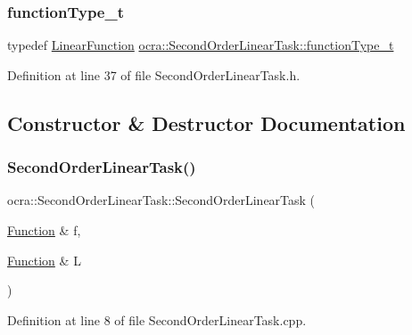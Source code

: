 \subsubsection{\texorpdfstring{function\+Type\+\_\+t}{functionType\_t}}
{\footnotesize\ttfamily typedef \hyperlink{classocra_1_1LinearFunction}{Linear\+Function} \hyperlink{classocra_1_1SecondOrderLinearTask_aa4843b0b2ad21ecba7decb2be86c6214}{ocra\+::\+Second\+Order\+Linear\+Task\+::function\+Type\+\_\+t}}



Definition at line 37 of file Second\+Order\+Linear\+Task.\+h.



\subsection{Constructor \& Destructor Documentation}
\hypertarget{classocra_1_1SecondOrderLinearTask_ac54c18fe5d5ba11cfc728361a8ab86eb}{}\label{classocra_1_1SecondOrderLinearTask_ac54c18fe5d5ba11cfc728361a8ab86eb} 
\subsubsection{\texorpdfstring{Second\+Order\+Linear\+Task()}{SecondOrderLinearTask()}}
{\footnotesize\ttfamily ocra\+::\+Second\+Order\+Linear\+Task\+::\+Second\+Order\+Linear\+Task (\begin{DoxyParamCaption}\item[{\hyperlink{classocra_1_1Function}{Function} \&}]{f,  }\item[{\hyperlink{classocra_1_1Function}{Function} \&}]{L }\end{DoxyParamCaption})}



Definition at line 8 of file Second\+Order\+Linear\+Task.\+cpp.

\hypertarget{classocra_1_1SecondOrderLinearTask_a9d27ffc898ce40ba091c59fd3e4bea6e}{}\label{classocra_1_1SecondOrderLinearTask_a9d27ffc898ce40ba091c59fd3e4bea6e} 

